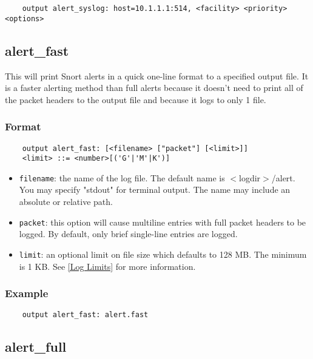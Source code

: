 \documentclass[english]{report}
\begin{document}
\begin{verbatim}
    output alert_syslog: host=10.1.1.1:514, <facility> <priority> <options>
\end{verbatim}

\subsection{alert\_fast}

This will print Snort alerts in a quick one-line format to a specified output
file. It is a faster alerting method than full alerts because it doesn't need
to print all of the packet headers to the output file and because it logs to
only 1 file.

\subsubsection{Format}

\begin{verbatim}
    output alert_fast: [<filename> ["packet"] [<limit>]]
    <limit> ::= <number>[('G'|'M'|K')]
\end{verbatim}

\begin{itemize}
\item \texttt{filename}: the name of the log file.  The default name is
$<$logdir$>$/alert.  You may specify "stdout" for terminal output.  The name may
include an absolute or relative path.

\item \texttt{packet}: this option will cause multiline entries with full
packet headers to be logged.  By default, only brief single-line entries are
logged.

\item \texttt{limit}: an optional limit on file size which defaults to 128 MB.  
The minimum is 1 KB.  See \ref{Log Limits} for more information.
\end{itemize}

\subsubsection{Example}

\begin{verbatim}
    output alert_fast: alert.fast
\end{verbatim}

\subsection{alert\_full}
\end{document}
